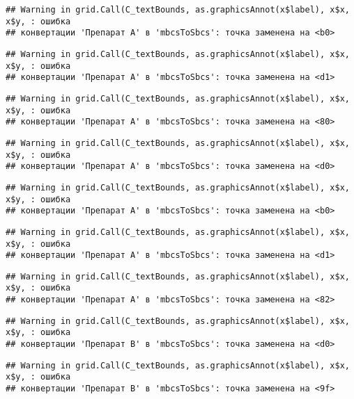 \documentclass[
]{article}
\begin{document}
\begin{verbatim}
## Warning in grid.Call(C_textBounds, as.graphicsAnnot(x$label), x$x, x$y, : ошибка
## конвертации 'Препарат A' в 'mbcsToSbcs': точка заменена на <b0>
\end{verbatim}

\begin{verbatim}
## Warning in grid.Call(C_textBounds, as.graphicsAnnot(x$label), x$x, x$y, : ошибка
## конвертации 'Препарат A' в 'mbcsToSbcs': точка заменена на <d1>
\end{verbatim}

\begin{verbatim}
## Warning in grid.Call(C_textBounds, as.graphicsAnnot(x$label), x$x, x$y, : ошибка
## конвертации 'Препарат A' в 'mbcsToSbcs': точка заменена на <80>
\end{verbatim}

\begin{verbatim}
## Warning in grid.Call(C_textBounds, as.graphicsAnnot(x$label), x$x, x$y, : ошибка
## конвертации 'Препарат A' в 'mbcsToSbcs': точка заменена на <d0>
\end{verbatim}

\begin{verbatim}
## Warning in grid.Call(C_textBounds, as.graphicsAnnot(x$label), x$x, x$y, : ошибка
## конвертации 'Препарат A' в 'mbcsToSbcs': точка заменена на <b0>
\end{verbatim}

\begin{verbatim}
## Warning in grid.Call(C_textBounds, as.graphicsAnnot(x$label), x$x, x$y, : ошибка
## конвертации 'Препарат A' в 'mbcsToSbcs': точка заменена на <d1>
\end{verbatim}

\begin{verbatim}
## Warning in grid.Call(C_textBounds, as.graphicsAnnot(x$label), x$x, x$y, : ошибка
## конвертации 'Препарат A' в 'mbcsToSbcs': точка заменена на <82>
\end{verbatim}

\begin{verbatim}
## Warning in grid.Call(C_textBounds, as.graphicsAnnot(x$label), x$x, x$y, : ошибка
## конвертации 'Препарат B' в 'mbcsToSbcs': точка заменена на <d0>
\end{verbatim}

\begin{verbatim}
## Warning in grid.Call(C_textBounds, as.graphicsAnnot(x$label), x$x, x$y, : ошибка
## конвертации 'Препарат B' в 'mbcsToSbcs': точка заменена на <9f>
\end{verbatim}
\end{document}
